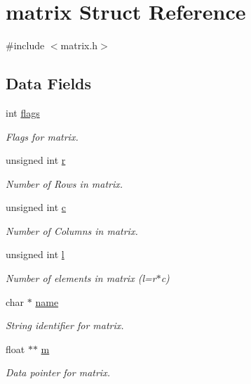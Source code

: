 \hypertarget{structmatrix}{}\section{matrix Struct Reference}
\label{structmatrix}


{\ttfamily \#include $<$matrix.\+h$>$}

\subsection*{Data Fields}
\begin{DoxyCompactItemize}
\item 
int \hyperlink{structmatrix_ab45b487b5fbdfe6df519d054d5acb245}{flags}
\begin{DoxyCompactList}\small\item\em Flags for matrix. \end{DoxyCompactList}\item 
unsigned int \hyperlink{structmatrix_ac5217ab574fd3214f35f417a947b4bb1}{r}
\begin{DoxyCompactList}\small\item\em Number of Rows in matrix. \end{DoxyCompactList}\item 
unsigned int \hyperlink{structmatrix_a9499b963be4febd5b909822a4d0ae290}{c}
\begin{DoxyCompactList}\small\item\em Number of Columns in matrix. \end{DoxyCompactList}\item 
unsigned int \hyperlink{structmatrix_a5be40caa3b21e52f4c60b0846f1bd6b1}{l}
\begin{DoxyCompactList}\small\item\em Number of elements in matrix (l=r$\ast$c) \end{DoxyCompactList}\item 
char $\ast$ \hyperlink{structmatrix_a1c8243eae410f7cdd9b8a63d1389c771}{name}
\begin{DoxyCompactList}\small\item\em String identifier for matrix. \end{DoxyCompactList}\item 
float $\ast$$\ast$ \hyperlink{structmatrix_af77977cdeb2c0c0590214bcf450f5991}{m}
\begin{DoxyCompactList}\small\item\em Data pointer for matrix. \end{DoxyCompactList}\end{DoxyCompactItemize}


